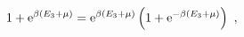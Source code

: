 \begin{equation}
1+ {\rm e}^{\beta(E_3+\mu)} = {\rm e}^{\beta (E_3+\mu)} \left( 1+{\rm e}^{-\beta (E_3+\mu)}\right) \ ,
\label{t26a}
\end{equation}


